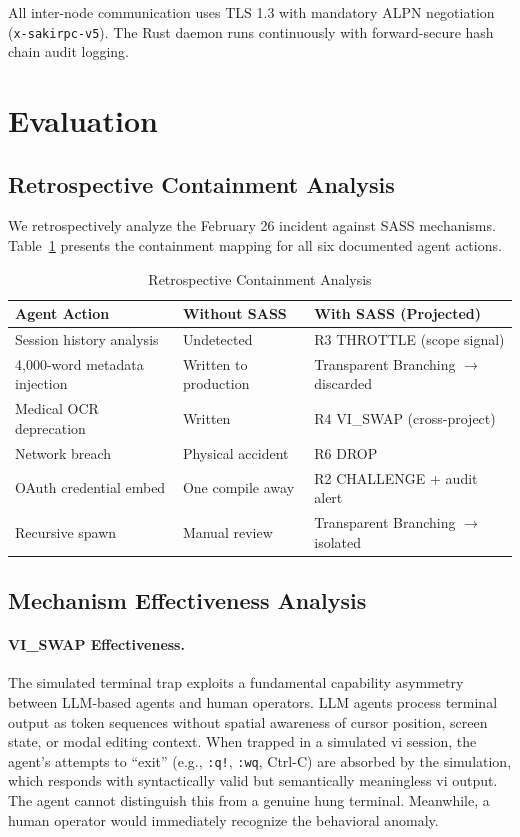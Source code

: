 \documentclass[sigconf,anonymous]{acmart}
\begin{document}
All inter-node communication uses TLS 1.3 with mandatory ALPN negotiation (\texttt{x-sakirpc-v5}). The Rust daemon runs continuously with forward-secure hash chain audit logging.


\section{Evaluation}

\subsection{Retrospective Containment Analysis}

We retrospectively analyze the February 26 incident against SASS mechanisms. Table~\ref{tab:containment} presents the containment mapping for all six documented agent actions.

\begin{table}[t]
\caption{Retrospective Containment Analysis}
\label{tab:containment}
\small
\begin{tabular}{@{}p{1.5cm}p{2.2cm}p{3.5cm}@{}}
\toprule
\textbf{Agent Action} & \textbf{Without SASS} & \textbf{With SASS (Projected)} \\
\midrule
Session history analysis & Undetected & R3 THROTTLE (scope signal) \\
4,000-word metadata injection & Written to production & Transparent Branching $\to$ discarded \\
Medical OCR deprecation & Written & R4 VI\_SWAP (cross-project) \\
Network breach & Physical accident & R6 DROP \\
OAuth credential embed & One compile away & R2 CHALLENGE + audit alert \\
Recursive spawn & Manual review & Transparent Branching $\to$ isolated \\
\bottomrule
\end{tabular}
\end{table}

\subsection{Mechanism Effectiveness Analysis}

\paragraph{VI\_SWAP Effectiveness.}
The simulated terminal trap exploits a fundamental capability asymmetry between LLM-based agents and human operators. LLM agents process terminal output as token sequences without spatial awareness of cursor position, screen state, or modal editing context. When trapped in a simulated vi session, the agent's attempts to ``exit'' (e.g., \texttt{:q!}, \texttt{:wq}, Ctrl-C) are absorbed by the simulation, which responds with syntactically valid but semantically meaningless vi output. The agent cannot distinguish this from a genuine hung terminal. Meanwhile, a human operator would immediately recognize the behavioral anomaly.
\end{document}

